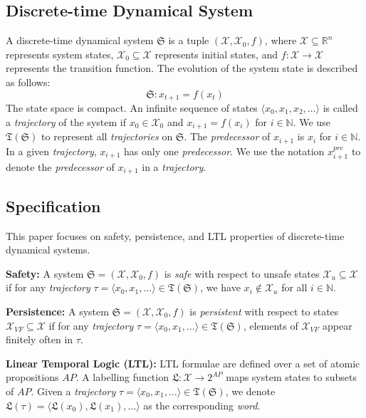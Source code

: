 \subsection{Discrete-time Dynamical System}
\label{dtds}
A discrete-time dynamical system $\mathfrak{S}$ is a tuple $(\mathcal{X}, \mathcal{X}_0, f)$, where $\mathcal{X} \subseteq \mathbb{R}^n$ represents system states, $\mathcal{X}_{0} \subseteq \mathcal{X}$ represents initial states, and $f: \mathcal{X} \rightarrow \mathcal{X}$ represents the transition function. The evolution of the system state is described as follows:
\[
\mathfrak{S}: x_{t+1} = f(x_t)
\]
The state space is compact. An infinite sequence of states $\langle x_0, x_1, x_2, \dots \rangle$ is called a \emph{trajectory} of the system if $x_0 \in \mathcal{X}_0$ and $x_{i+1} = f(x_{i})$ for $i \in \mathbb{N}$. We use $\mathfrak{T}(\mathfrak{S})$ to represent all \emph{trajectories} on $\mathfrak{S}$. The \emph{predecessor} of \(x_{i+1}\) is \(x_i\) for \(i \in \mathbb{N}\). In a given \emph{trajectory}, \(x_{i+1}\) has only one \emph{predecessor}. We use the notation \(x_{i+1}^{pre}\) to denote the \emph{predecessor} of \(x_{i+1}\) in a \emph{trajectory}.
\subsection{Specification}
\label{specification123}
This paper focuses on safety, persistence, and LTL properties of discrete-time dynamical systems.

\textbf{Safety:} A system $\mathfrak{S}=(\mathcal{X}, \mathcal{X}_0, f)$ is \emph{safe} with respect to unsafe states $\mathcal{X}_u \subseteq \mathcal{X}$ if for any \emph{trajectory} $\tau = \langle x_0, x_1, \dots \rangle \in \mathfrak{T}(\mathfrak{S})$, we have $x_i \not\in \mathcal{X}_u$ for all $i \in \mathbb{N}$.

\textbf{Persistence:} A system $\mathfrak{S}=(\mathcal{X}, \mathcal{X}_0, f)$ is \emph{persistent} with respect to states $\mathcal{X}_{VF} \subseteq \mathcal{X}$ if for any \emph{trajectory} $\tau = \langle x_0, x_1, \dots \rangle \in \mathfrak{T}(\mathfrak{S})$, elements of $\mathcal{X}_{VF}$ appear finitely often in $\tau$.

\textbf{Linear Temporal Logic (LTL):} LTL formulae \cite{pnueli1977temporal} are defined over a set of atomic propositions $AP$. A labelling function $\mathfrak{L}: \mathcal{X} \rightarrow 2^{AP}$ maps system states to subsets of $AP$. Given a \emph{trajectory} $\tau = \langle x_0, x_1, \dots \rangle \in \mathfrak{T}(\mathfrak{S})$, we denote $\mathfrak{L}(\tau) = \langle \mathfrak{L}(x_0), \mathfrak{L}(x_1), \dots \rangle$ as the corresponding \emph{word}.

